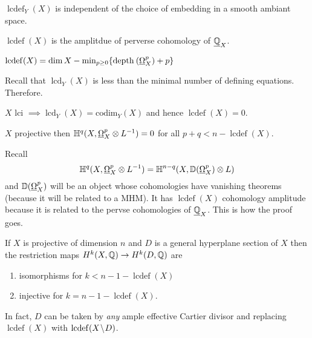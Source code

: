 \documentclass[12pt]{article}
\newcommand{\HH}{\mathbb{H}}
\renewcommand{\codim}{\mathrm{codim}}
\DeclareMathOperator{\lcdef}{\mathrm{lcdef}}
\DeclareMathOperator{\lcd}{\mathrm{lcd}}
\begin{document}
\begin{prop}
$\lcdef_Y(X)$ is independent of the choice of embedding in a smooth ambiant space. 
\end{prop}

\begin{theorem}
$\lcdef(X)$ is the amplitdue of perverse cohomology of $\underline{\mathbb{Q}}_X$. 
\end{theorem}

\begin{theorem}[Mustata-P.]
$\lcdef(X) = \dim{X} - \min_{p \ge 0} \{ \depth{}{\ulO_X^p} + p \}$ 
\end{theorem}

Recall that $\lcd_Y(X)$ is less than the minimal number of defining equations. Therefore.

\begin{example}
$X$ lci $\implies \lcd_Y(X) = \codim_Y(X)$ and hence $\lcdef(X) = 0$.  
\end{example}

\begin{theorem}
$X$ projective then $\HH^q(X, \ulO_X^p \ot L^{-1}) = 0$ for all $p + q < n - \lcdef(X)$. 
\end{theorem}

Recall
\[ \HH^q(X, \ulO_X^p \ot L^{-1}) = \HH^{n-q}(X, \DD(\ulO_X^p) \ot L) \]
and $\mathbb{D}(\underline{\Omega}_X^p)$ will be an object whose cohomologies have vanishing theorems (because it will be related to a MHM). It has $\lcdef(X)$ cohomology amplitude because it is related to the pervse cohomologies of $\underline{\mathbb{Q}}_X$. This is how the proof goes. 

\begin{theorem}
If $X$ is projective of dimension $n$ and $D$ is a general hyperplane section of $X$ then the restriction maps $H^k(X, \mathbb{Q}) \to H^k(D, \mathbb{Q})$ are
\begin{enumerate}
\item isomorphisms for $k < n - 1 - \lcdef(X)$
\item injective for $k = n - 1 - \lcdef(X)$. 
\end{enumerate} 
\end{theorem}

\begin{rmk}
In fact, $D$ can be taken by \textit{any} ample effective Cartier divisor and replacing $\lcdef(X)$ with $\lcdef(X \sm D)$. 
\end{rmk}
\end{document}
